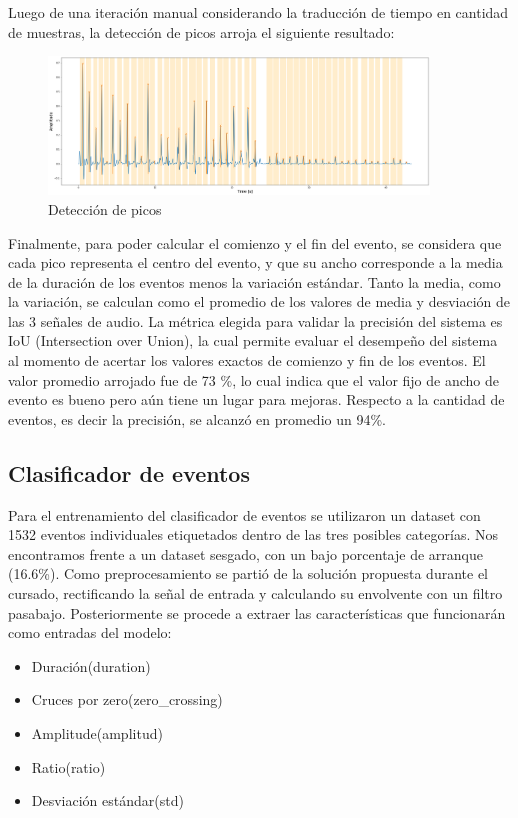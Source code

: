 \documentclass[11pt]{charter}
\begin{document}
Luego de una iteración manual considerando la traducción de tiempo en cantidad de muestras, la detección de picos arroja el siguiente resultado:
\begin{figure}[H]
	\centering 
	\includegraphics[width=0.9\textwidth, scale=1]{./Figuras/peaks.png}
	\caption{Detección de picos}
	\label{fig:peaks}
\end{figure}
Finalmente, para poder calcular el comienzo y el fin del evento, se considera que cada pico representa el centro del evento, y que su ancho corresponde a la media de la duración de los eventos menos la variación estándar. Tanto la media, como la variación, se calculan como el promedio de los valores de media y desviación de las 3 señales de audio. La métrica elegida para validar la precisión del sistema es IoU (Intersection over Union), la cual permite evaluar el desempeño del sistema al momento de acertar los valores exactos de comienzo y fin de los eventos. 
El valor promedio arrojado fue de 73 \%, lo cual indica que el valor fijo de ancho de evento es bueno pero aún tiene un lugar para mejoras. Respecto a la cantidad de eventos, es decir la precisión, se alcanzó en promedio un 94\%. 

\subsection{Clasificador de eventos}
Para el entrenamiento del clasificador de eventos se utilizaron un dataset con 1532 eventos individuales etiquetados dentro de las tres posibles categorías. Nos encontramos frente a un dataset sesgado, con un bajo porcentaje de arranque (16.6\%).
Como preprocesamiento se partió de la solución propuesta durante el cursado, rectificando la señal de entrada y calculando su envolvente con un filtro pasabajo. Posteriormente se procede a extraer las características que funcionarán como entradas del modelo:
\begin{itemize}
	\item Duración(duration)
	\item Cruces por zero(zero\_crossing)
	\item Amplitude(amplitud)
	\item Ratio(ratio)
	\item Desviación estándar(std)
\end{itemize}
\end{document}
